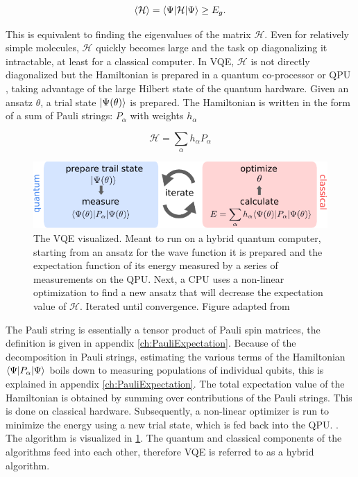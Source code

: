 \begin{equation}\label{eq:VariationalPrinciple}
	\left\langle \mathcal{H} \right\rangle = \langle\Psi\rvert\mathcal{H} \lvert\Psi\rangle \geq E_g.
\end{equation}

This is equivalent to finding the eigenvalues of the matrix $\mathcal{H}$. 
Even for relatively simple molecules, $\mathcal{H}$ quickly becomes large and the task op diagonalizing it intractable, at least for a classical computer.
In \ac{VQE}, $\mathcal{H}$ is not directly diagonalized but the Hamiltonian is prepared in a quantum co-processor or \ac{QPU} \cite{Henriet2020,Peruzzo2014}, taking advantage of the large Hilbert state of the quantum hardware.
Given an ansatz $\theta$, a trial state $\lvert\Psi(\theta)\rangle$ is prepared.
The Hamiltonian is written in the form of a sum of Pauli strings: $P_{\alpha}$ with weights $h_{\alpha}$ \cite{McClean2016,Moll2018}

\begin{equation}\label{eq:PauliDecomposition}
	\mathcal{H} = \sum_{\alpha} h_{\alpha} P_{\alpha}
\end{equation}

\begin{figure}
	\centering
	\includegraphics[width=0.75\linewidth]{figures/VQE.pdf}
	\caption{The \ac{VQE} visualized. 
	Meant to run on a hybrid quantum computer, starting from an ansatz for the wave function it is prepared and the expectation function of its energy measured by a series of measurements on the \ac{QPU}.
	Next, a CPU uses a non-linear optimization to find a new ansatz that will decrease the expectation value of $\mathcal{H}$. Iterated until convergence. Figure adapted from \cite{Moll2018}}
	\label{fig:VQE}
\end{figure}

The Pauli string is essentially a tensor product of Pauli spin matrices, the definition is given in appendix \ref{ch:PauliExpectation}. 
Because of the decomposition in Pauli strings, estimating the various terms of the Hamiltonian $\langle\Psi\rvert P_{\alpha} \lvert\Psi\rangle$ boils down to measuring populations of individual qubits, this is explained in appendix \ref{ch:PauliExpectation}. 
The total expectation value of the Hamiltonian is obtained by summing over contributions of the Pauli strings.
This is done on classical hardware.
Subsequently, a non-linear optimizer is run to minimize the energy using a new trial state, which is fed back into the \ac{QPU}.
\cite{Moll2018}. 
The algorithm is visualized in \cref{fig:VQE}.
The quantum and classical components of the algorithms feed into each other, therefore \ac{VQE} is referred to as a hybrid algorithm. 

